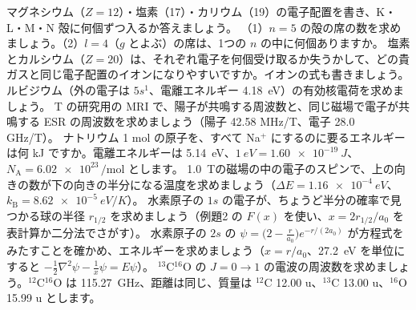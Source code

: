 \bkendproblems
{}
\bkproblem マグネシウム（$Z=12$）・塩素（17）・カリウム（19）の電子配置を書き、K・L・M・N 殻に何個ずつ入るか答えましょう。
\bkproblem （1）$n=5$ の殻の席の数を求めましょう。（2）$l=4$（$g$ とよぶ）の席は、1つの $n$ の中に何個ありますか。
\bkproblem 塩素とカルシウム（$Z=20$）は、それぞれ電子を何個受け取るか失うかして、どの貴ガスと同じ電子配置のイオンになりやすいですか。イオンの式も書きましょう。
\bkproblem ルビジウム（外の電子は $5s^1$、電離エネルギー \qty{4.18}{eV}）の有効核電荷を求めましょう。
 T の研究用の MRI で、陽子が共鳴する周波数と、同じ磁場で電子が共鳴する ESR の周波数を求めましょう（陽子 42.58 MHz/T、電子 28.0 GHz/T）。
\bkproblem ナトリウム 1 mol の原子を、すべて Na$^+$ にするのに要るエネルギーは何 kJ ですか。電離エネルギーは \qty{5.14}{eV}、$\qty{1}{eV}=\qty{1.60e-19}{J}$、$N_{\mathrm A}=\num{6.02e23}\,\mathrm{/mol}$ とします。
\bkproblem \qty{1.0}{T}の磁場の中の電子のスピンで、上の向きの数が下の向きの半分になる温度を求めましょう（$\Delta E=\qty{1.16e-4}{eV}$、$k_{\mathrm B}=\qty{8.62e-5}{eV/K}$）。
\bkproblem 水素原子の $1s$ の電子が、ちょうど半分の確率で見つかる球の半径 $r_{1/2}$ を求めましょう（例題2 の $F(x)$ を使い、$x=2r_{1/2}/a_0$ を表計算か二分法でさがす）。
\bkproblem 水素原子の $2s$ の $\psi=\bigl(2-\tfrac{r}{a_0}\bigr)e^{-r/(2a_0)}$ が方程式をみたすことを確かめ、エネルギーを求めましょう（$x=r/a_0$、\qty{27.2}{eV} を単位にすると $-\tfrac12\nabla^2\psi-\tfrac1x\psi=E\psi$）。
\bkproblem $^{13}$C$^{16}$O の $J=0\to1$ の電波の周波数を求めましょう。$^{12}$C$^{16}$O は \qty{115.27}{GHz}、距離は同じ、質量は $^{12}$C 12.00 u、$^{13}$C 13.00 u、$^{16}$O 15.99 u とします。

